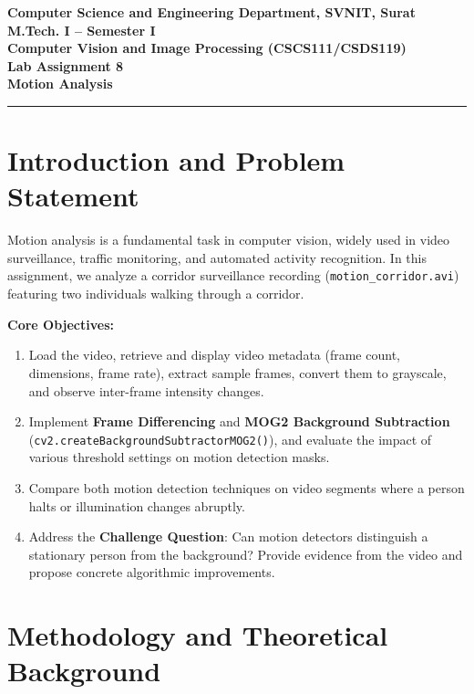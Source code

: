\documentclass[12pt]{article}
\begin{document}

\begin{center}
\textbf{Computer Science and Engineering Department, SVNIT, Surat}\\
\textbf{M.Tech. I -- Semester I}\\
\textbf{Computer Vision and Image Processing (CSCS111/CSDS119)}\\
\textbf{Lab Assignment 8}\\
\textbf{Motion Analysis}
\end{center}
\vspace{-4pt}
\hrule
\vspace{6pt}

\section{Introduction and Problem Statement}
Motion analysis is a fundamental task in computer vision, widely used in video surveillance, traffic monitoring, and automated activity recognition. In this assignment, we analyze a corridor surveillance recording (\texttt{motion\_corridor.avi}) featuring two individuals walking through a corridor. 

\textbf{Core Objectives:}
\begin{enumerate}
    \item Load the video, retrieve and display video metadata (frame count, dimensions, frame rate), extract sample frames, convert them to grayscale, and observe inter-frame intensity changes.
    \item Implement \textbf{Frame Differencing} and \textbf{MOG2 Background Subtraction} (\texttt{cv2.createBackgroundSubtractorMOG2()}), and evaluate the impact of various threshold settings on motion detection masks.
    \item Compare both motion detection techniques on video segments where a person halts or illumination changes abruptly.
    \item Address the \textbf{Challenge Question}: Can motion detectors distinguish a stationary person from the background? Provide evidence from the video and propose concrete algorithmic improvements.
\end{enumerate}

\section{Methodology and Theoretical Background}
\end{document}
